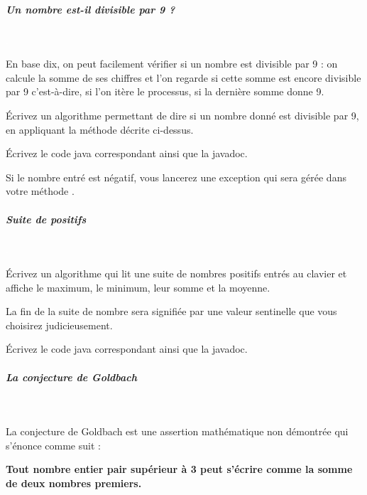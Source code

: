 \documentclass[11pt,a4paper]{article}
\begin{document}
            \par
        
			
		\subparagraph{Un nombre est-il divisible par 9 ?} 
		
					\textcolor{white}{.} \par
				
          En base dix, on peut facilement v\'erifier si un nombre est divisible par 9 :
          on calcule la somme de ses chiffres et l'on regarde si cette somme est encore divisible par 9
          c'est-\`a-dire, si l'on it\`ere le processus, si la derni\`ere somme donne 9. \par
				
          \'Ecrivez un algorithme permettant de dire si un nombre donn\'e est divisible par 9, en appliquant la m\'ethode d\'ecrite ci-dessus.
        
            \par
        \'Ecrivez le code java correspondant ainsi que la javadoc.
            \par
        Si le nombre entr\'e est n\'egatif, vous lancerez une exception qui sera g\'er\'ee dans votre m\'ethode \verb@main@.
            \par
        
			
		\subparagraph{Suite de positifs} 
		
					\textcolor{white}{.} \par
				
          \'Ecrivez un algorithme qui lit une suite de nombres positifs entr\'es au clavier et affiche
          le maximum, le minimum, leur somme et la moyenne.\par
				
          La fin de la suite de nombre sera signifi\'ee par une valeur sentinelle que vous choisirez
          judicieusement.
        
            \par
        \'Ecrivez le code java correspondant ainsi que la javadoc.
            \par
        
			
		\subparagraph{La conjecture de Goldbach} 
		
					\textcolor{white}{.} \par
				
          La conjecture de Goldbach est une assertion math\'ematique non d\'emontr\'ee qui s'\'enonce comme suit :
        
            \par
        \textbf{Tout nombre entier pair sup\'erieur \`a 3 peut s'\'ecrire comme la somme de deux nombres premiers.}
            \par
        
\end{document}
